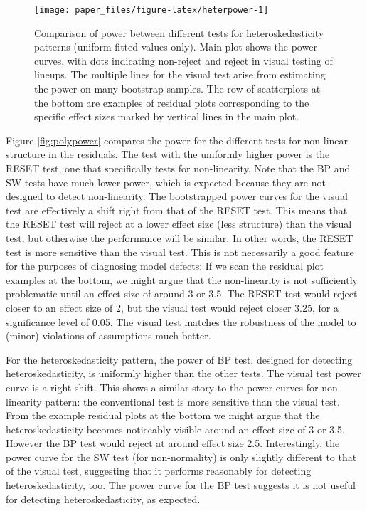 \documentclass[]{interact}
\theoremstyle{plain}%
\theoremstyle{definition}
\theoremstyle{remark}
\begin{document}
\begin{figure}

{\centering \texttt{[image: paper\_files/figure-latex/heterpower-1]} 

}

\caption{Comparison of power between different tests for heteroskedasticity patterns (uniform fitted values only). Main plot shows the power curves, with dots indicating non-reject and reject in visual testing of lineups. The multiple lines for the visual test arise from estimating the power on many bootstrap samples. The row of scatterplots at the bottom are examples of residual plots corresponding to the specific effect sizes marked by vertical lines in the main plot.}\label{fig:heterpower}
\end{figure}

Figure \ref{fig:polypower} compares the power for the different tests
for non-linear structure in the residuals. The test with the uniformly
higher power is the RESET test, one that specifically tests for
non-linearity. Note that the BP and SW tests have much lower power,
which is expected because they are not designed to detect non-linearity.
The bootstrapped power curves for the visual test are effectively a
shift right from that of the RESET test. This means that the RESET test
will reject at a lower effect size (less structure) than the visual
test, but otherwise the performance will be similar. In other words, the
RESET test is more sensitive than the visual test. This is not
necessarily a good feature for the purposes of diagnosing model defects:
If we scan the residual plot examples at the bottom, we might argue that
the non-linearity is not sufficiently problematic until an effect size
of around 3 or 3.5. The RESET test would reject closer to an effect size
of 2, but the visual test would reject closer 3.25, for a significance
level of 0.05. The visual test matches the robustness of the model to
(minor) violations of assumptions much better.

For the heteroskedasticity pattern, the power of BP test, designed for
detecting heteroskedasticity, is uniformly higher than the other tests.
The visual test power curve is a right shift. This shows a similar story
to the power curves for non-linearity pattern: the conventional test is
more sensitive than the visual test. From the example residual plots at
the bottom we might argue that the heteroskedasticity becomes noticeably
visible around an effect size of 3 or 3.5. However the BP test would
reject at around effect size 2.5. Interestingly, the power curve for the
SW test (for non-normality) is only slightly different to that of the
visual test, suggesting that it performs reasonably for detecting
heteroskedasticity, too. The power curve for the BP test suggests it is
not useful for detecting heteroskedasticity, as expected.
\end{document}
